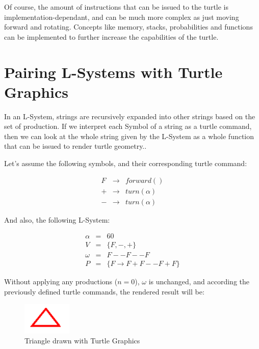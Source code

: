 \documentclass{acmtog}
\begin{document}
Of course, the amount of instructions that can be issued to the turtle is implementation-dependant, and can be much more complex as just moving forward and rotating. Concepts like memory, stacks, probabilities and functions can be implemented to further increase the capabilities of the turtle.

\section{Pairing L-Systems with Turtle Graphics}
\label{sec:pairing}

In an L-System, strings are recursively expanded into other strings based on the set of production. If we interpret each Symbol of a string as a turtle command, then we can look at the whole string given by the L-System as a whole function that can be issued to render turtle geometry..

Let's assume the following symbols, and their corresponding turtle command:

\begin{eqnarray*}
    F & \rightarrow &  forward()  \\
    + & \rightarrow &  turn(\alpha)   \\
    - & \rightarrow &  turn(\alpha)  
\end{eqnarray*}

And also, the following L-System:

\begin{eqnarray*}
  \alpha  &=& 60                         \\
  V       &=& \{F, -, +\}                \\
  \omega  &=& F--F--F                     \\
  P       &=& \{F \rightarrow F+F--F+F \}    
\end{eqnarray*}

Without applying any productions ($n=0$), $\omega$ is unchanged, and according the previously defined turtle commands, the rendered result will be:

\begin{figure}[!htp]
  \begin{center}
    \includegraphics{images/1_triangle}
    \caption{Triangle drawn with Turtle Graphics \label{fig:triangle}}
    \end{center}
\end{figure}
\end{document}
